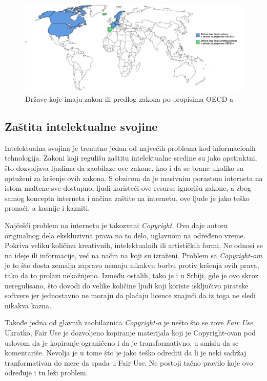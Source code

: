 \documentclass[a4paper]{article}
\begin{document}
{\begin{figure}[h!]
\begin{center}
\includegraphics[scale=0.2]{karta.png}
\end{center}
\caption{Države koje imaju zakon ili predlog zakona po propisima OECD-a}
\label{karta}
\end{figure}

\subsection{Zaštita intelektualne svojine}

Intelektualna svojina je trenutno jedan od najvećih problema kod informacionih tehnologija. Zakoni koji regulišu zaštitu intelektualne sredine su jako apstraktni, što dozvoljava ljudima da zaobilaze ove zakone, kao i da se brane ukoliko su optuženi za kršenje ovih zakona. S obzirom da je masivnim porastom interneta na istom maltene sve dostupno, ljudi koristeći ove resurse ignorišu zakone, a zbog samog koncepta interneta i načina zaštite na internetu, ove ljude je jako teško pronaći, a kasnije i kazniti.

Najčešći problem na internetu je takozvani \emph{Copyright}. Ovo daje autoru originalnog dela ekskluzivna prava na to delo, uglavnom na određeno vreme. Pokriva veliku količinu kreativnih, intelektualnih ili artističkih formi. Ne odnosi se na ideje ili informacije, već na način na koji su izraženi.\cite{Copyright} Problem sa \emph{Copyright-om} je to što dosta zemalja zapravo nemaju nikakvu borbu protiv kršenja ovih prava, tako da to prolazi ne\-ka\-žnje\-no. Između ostalih, tako je i u Srbiji, gde je ovo skroz neregulisano, što dovodi do velike količine ljudi koji koriste isključivo piratske softvere jer jednostavno ne moraju da plaćaju licence znajući da iz toga ne sledi nikakva kazna.

Takođe jedna od glavnih zaobilaznica \emph{Copyright-a} je nešto što se zove \emph{Fair Use}. Ukratko, Fair Use je dozvoljeno kopiranje materijala koji je Copyright-ovan pod uslovom da je kopiranje ograničeno i da je transformativno, u smislu da se komentariše. Nevolja je u tome što je jako teško odrediti da li je neki sadržaj tranformativan do mere da spada u Fair Use. Ne postoji tačno pravilo koje ovo određuje i tu leži problem.

}
\end{document}

